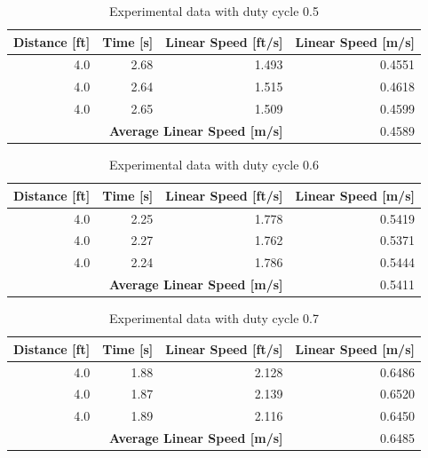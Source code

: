 \documentclass[fontsize=11pt, %
                             paper=letter, %
                             openany, %
                             captions=tableheading,
                             index=totoc,
                             hyperref]{labbook}
\begin{document}
\begin{addmargin}[0cm]{0cm}
\begin{table}[h!]
    \centering
    \begin{tabular}{r|r|r|r}
        \toprule
        \textbf{Distance [ft]} & \textbf{Time [s]} & \textbf{Linear Speed [ft/s]} & \textbf{Linear Speed [m/s]}\\
        \toprule
        4.0 & 2.68 & 1.493 & 0.4551\\
        4.0 & 2.64 & 1.515 & 0.4618\\
        4.0 & 2.65 & 1.509 & 0.4599\\
        \bottomrule
        \multicolumn{3}{r|}{\textbf{Average Linear Speed [m/s]}} & 0.4589\\
        \bottomrule
    \end{tabular}
    \caption{Experimental data with duty cycle 0.5}
    \label{tab:duty0.5}
\end{table}

\begin{table}[h!]
    \centering
    \begin{tabular}{r|r|r|r}
        \toprule
        \textbf{Distance [ft]} & \textbf{Time [s]} & \textbf{Linear Speed [ft/s]} & \textbf{Linear Speed [m/s]}\\
        \toprule
        4.0 & 2.25 & 1.778 & 0.5419\\
        4.0 & 2.27 & 1.762 & 0.5371\\
        4.0 & 2.24 & 1.786 & 0.5444\\
        \bottomrule
        \multicolumn{3}{r|}{\textbf{Average Linear Speed [m/s]}} & 0.5411\\
        \bottomrule
    \end{tabular}
    \caption{Experimental data with duty cycle 0.6}
    \label{tab:duty0.6}
\end{table}

\begin{table}[h!]
    \centering
    \begin{tabular}{r|r|r|r}
        \toprule
        \textbf{Distance [ft]} & \textbf{Time [s]} & \textbf{Linear Speed [ft/s]} & \textbf{Linear Speed [m/s]}\\
        \toprule
        4.0 & 1.88 & 2.128 & 0.6486\\
        4.0 & 1.87 & 2.139 & 0.6520\\
        4.0 & 1.89 & 2.116 & 0.6450\\
        \bottomrule
        \multicolumn{3}{r|}{\textbf{Average Linear Speed [m/s]}} & 0.6485\\
        \bottomrule
    \end{tabular}
    \caption{Experimental data with duty cycle 0.7}
    \label{tab:duty0.7}
\end{table}


\end{addmargin}
\end{document}
